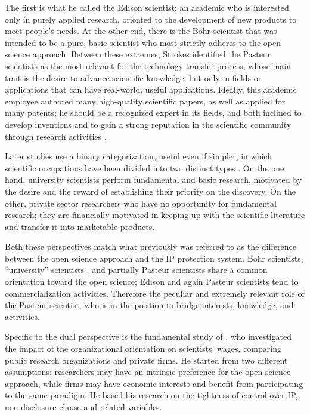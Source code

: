 The first is what he called the Edison scientist: an academic who is interested only in purely applied research, oriented to the development of new products to meet people's needs. At the other end, there is the Bohr scientist that was intended to be a pure, basic scientist who most strictly adheres to the open science approach. Between these extremes, Strokes identified the Pasteur scientists as the most relevant for the technology transfer process, whose main trait is the desire to advance scientific knowledge, but only in fields or applications that can have real-world, useful applications. Ideally, this academic employee authored many high-quality scientific papers, as well as applied for many patents; he should be a recognized expert in its fields, and both inclined to develop inventions and to gain a strong reputation in the scientific community through research activities \citep{Baba2009}.

Later studies use a binary categorization, useful even if simpler, in which scientific occupations have been divided into two distinct types \citep{Beath2000}. On the one hand, university scientists perform fundamental and basic research, motivated by the desire and the reward of establishing their priority on the discovery. On the other, private sector researchers who have no opportunity for fundamental research; they are financially motivated in keeping up with the scientific literature and transfer it into marketable products. 

Both these perspectives match what previously was referred to as the difference between the open science approach and the IP protection system. Bohr scientists, \enquote{university} scientists \citep{Beath2000}, and partially Pasteur scientists share a common orientation toward the open science; Edison and again Pasteur scientists tend to commercialization activities. Therefore the peculiar and extremely relevant role of the Pasteur scientist, who is in the position to bridge interests, knowledge, and activities.

Specific to the dual perspective is the fundamental study of \citet{Stern2004}, who investigated the impact of the organizational orientation on scientists' wages, comparing public research organizations and private firms. He started from two different assumptions: researchers may have an intrinsic preference for the open science approach, while firms may have economic interests and benefit from participating to the same paradigm. He based his research on the tightness of control over IP, non-disclosure clause and related variables.

